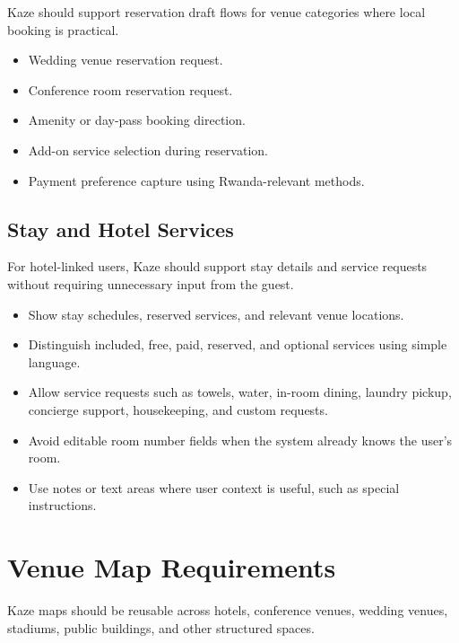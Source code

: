 \documentclass[11pt,a4paper]{article}
\begin{document}
Kaze should support reservation draft flows for venue categories where local booking is practical.

\begin{itemize}
    \item Wedding venue reservation request.
    \item Conference room reservation request.
    \item Amenity or day-pass booking direction.
    \item Add-on service selection during reservation.
    \item Payment preference capture using Rwanda-relevant methods.
\end{itemize}

\subsection{Stay and Hotel Services}

For hotel-linked users, Kaze should support stay details and service requests without requiring unnecessary input from the guest.

\begin{itemize}
    \item Show stay schedules, reserved services, and relevant venue locations.
    \item Distinguish included, free, paid, reserved, and optional services using simple language.
    \item Allow service requests such as towels, water, in-room dining, laundry pickup, concierge support, housekeeping, and custom requests.
    \item Avoid editable room number fields when the system already knows the user's room.
    \item Use notes or text areas where user context is useful, such as special instructions.
\end{itemize}

\section{Venue Map Requirements}

Kaze maps should be reusable across hotels, conference venues, wedding venues, stadiums, public buildings, and other structured spaces.
\end{document}
